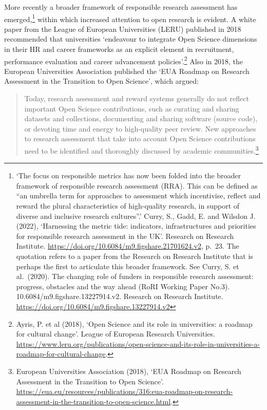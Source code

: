 \documentclass[
  letterpaper,
  DIV=11,
  numbers=noendperiod,
  oneside]{scrreprt}
\begin{document}
More recently a broader framework of responsible research assessment has
emerged,\footnote{`The focus on responsible metrics has now been folded
  into the broader framework of responsible research assessment (RRA).
  This can be defined as ``an umbrella term for approaches to assessment
  which incentivise, reflect and reward the plural characteristics of
  high-quality research, in support of diverse and inclusive research
  cultures''.' Curry, S., Gadd, E. and Wilsdon J. (2022), `Harnessing
  the metric tide: indicators, infrastructures and priorities for
  responsible research assessment in the UK'. Research on Research
  Institute. \url{https://doi.org/10.6084/m9.figshare.21701624.v2},
  p.~23. The quotation refers to a paper from the Research on Research
  Institute that is perhaps the first to articulate this broader
  framework. See Curry, S. et al.~(2020). The changing role of funders
  in responsible research assessment: progress, obstacles and the way
  ahead (RoRI Working Paper No.3). 10.6084/m9.figshare.13227914.v2.
  Research on Research Institute.
  \url{https://doi.org/10.6084/m9.figshare.13227914.v2}} within which
increased attention to open research is evident. A white paper from the
League of European Universities (LERU) published in 2018 recommended
that universities `endeavour to integrate Open Science dimensions in
their HR and career frameworks as an explicit element in recruitment,
performance evaluation and career advancement policies'.\footnote{Ayris,
  P. et al (2018), `Open Science and its role in universities: a roadmap
  for cultural change'. League of European Research Universities.
  \url{https://www.leru.org/publications/open-science-and-its-role-in-universities-a-roadmap-for-cultural-change}.}
Also in 2018, the European Universities Association published the `EUA
Roadmap on Research Assessment in the Transition to Open Science', which
argued:

\begin{quote}
Today, research assessment and reward systems generally do not reflect
important Open Science contributions, such as curating and sharing
datasets and collections, documenting and sharing software (source
code), or devoting time and energy to high-quality peer review. New
approaches to research assessment that take into account Open Science
contributions need to be identified and thoroughly discussed by academic
communities.\footnote{European Universities Association (2018), `EUA
  Roadmap on Research Assessment in the Transition to Open Science'.
  \url{https://eua.eu/resources/publications/316:eua-roadmap-on-research-assessment-in-the-transition-to-open-science.html}.}
\end{quote}
\end{document}
